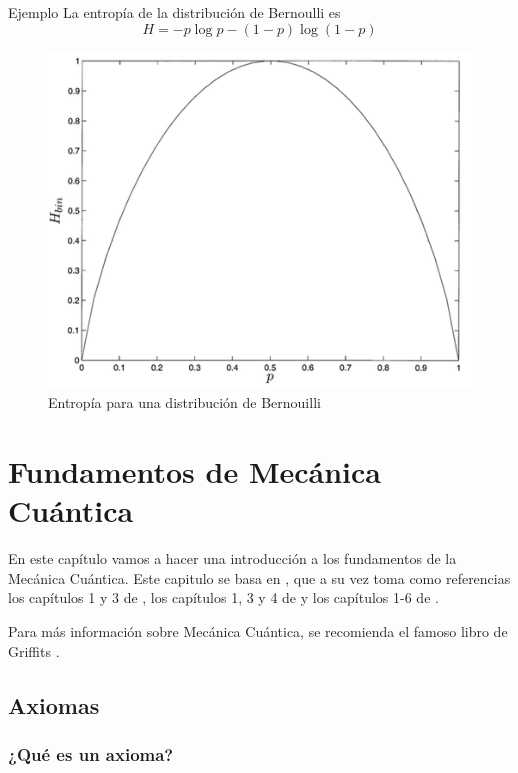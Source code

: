\documentclass[a4paper,11pt]{book} %
\numberwithin{equation}{chapter}
\begin{document}
	\begin{mybox_green}{Ejemplo}
	La entropía de la distribución de Bernoulli es 
	\begin{equation}
	H = - p\log p -(1-p)\log (1-p)
	\end{equation}
	
		\begin{figure}[H]
		\centering 
		\includegraphics[width=0.5\linewidth]{Figuras/Fig_formalismo_binaryentropy.png}
		\caption{Entropía para una distribución de Bernouilli}
		\label{Fig_formalismo_binaryentropy}
		\end{figure}
	\end{mybox_green}
	
















\chapter{Fundamentos de Mecánica Cuántica} \label{cap_fundamentos}

En este capítulo vamos a hacer una introducción a los fundamentos de la Mecánica Cuántica. Este capitulo se basa en \cite{Curso-JMas}, que a su vez toma como referencias los capítulos 1 y 3 de \cite{Claude}, los capítulos 1, 3 y 4 de \cite{le_bellac_2006} y los capítulos 1-6 de \cite{fayngold2013quantum}. 

Para más información sobre Mecánica Cuántica, se recomienda el famoso libro de Griffits \cite{griffiths_schroeter_2018}.

	\section{Axiomas}


		\subsection{¿Qué es un axioma?}
\end{document}
